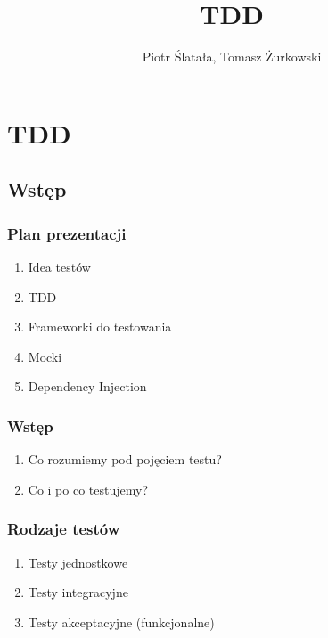 \documentclass[slidestop,compress,mathserif]{beamer}
\title{TDD}
\author{Piotr Ślatała, Tomasz Żurkowski}
\begin{document}
\section{TDD}

\subsection{Wstęp}
\frame{
 \titlepage
}

\begin{frame}
 \frametitle{Plan prezentacji}
 \begin{enumerate}
 \item Idea testów
 \pause \item TDD
 \pause \item Frameworki do testowania
 \pause \item Mocki
 \pause \item Dependency Injection
\end{enumerate}

\end{frame}


\begin{frame}
 \frametitle{Wstęp}
\begin{enumerate}
 \item Co rozumiemy pod pojęciem testu? %
 \pause \item Co i po co testujemy? %
\end{enumerate}
\end{frame}

\begin{frame}
\frametitle{Rodzaje testów}
 \begin{enumerate}
  \item Testy jednostkowe
  \pause \item Testy integracyjne
  \pause \item Testy akceptacyjne (funkcjonalne)
\end{enumerate}
\end{frame}
\end{document}
